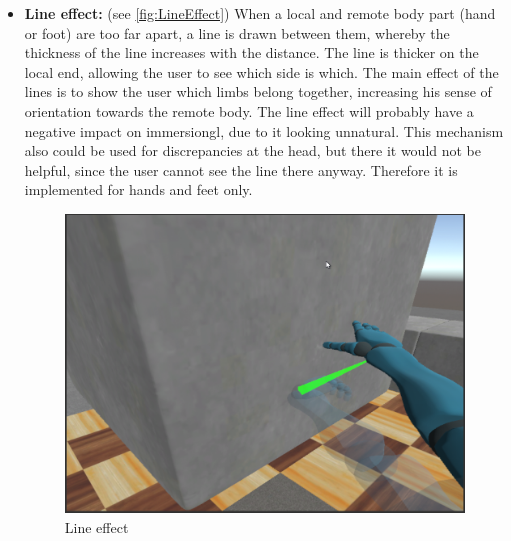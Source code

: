 \begin{itemize}
    
    \item \textbf{Line effect:} (see \autoref{fig:LineEffect})
    \newline
    When a local and remote body part (hand or foot) are too far apart, a line is drawn between them, whereby the thickness of the line increases with the distance. The line is thicker on the local end, allowing the user to see which side is which. The main effect of the lines is to show the user which limbs belong together, increasing his sense of orientation towards the remote body. The line effect will probably have a negative impact on \gls{immersiongl}, due to it looking unnatural.
    \newline
    This mechanism also could be used for discrepancies at the head, but there it would not be helpful, since the user cannot see the line there anyway. Therefore it is implemented for hands and feet only.
    \begin{figure}[h]
        \centering
        \includegraphics[height=0.2\textheight]{figures/LineEffect.png}
        \caption{Line effect}
        \label{fig:LineEffect}
    \end{figure}
    

\end{itemize}
